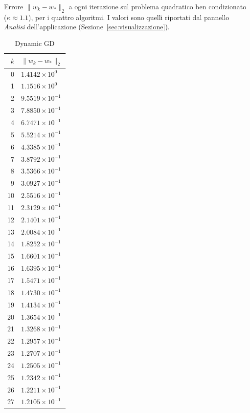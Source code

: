 \documentclass[italian, a4paper, twoside, binding=6mm]{sapthesis}
\begin{document}
\begin{table}[H]
\centering
\footnotesize
\renewcommand{\arraystretch}{0.85}
\setlength{\tabcolsep}{3pt}
\caption{Errore $\|w_k-w_*\|_2$ a ogni iterazione sul problema quadratico ben condizionato ($\kappa \approx 1.1$), per i quattro algoritmi. I valori sono quelli riportati dal pannello \emph{Analisi} dell'applicazione (Sezione~\ref{sec:visualizzazione}).}
\label{tab:test_bencond}
\begin{subtable}{0.24\textwidth}
\centering
\caption{Dynamic GD}
\begin{tabular}{@{}rl@{}}
\toprule
$k$ & $\|w_k-w_*\|_2$\\
\midrule
0 & $1.4142\times10^{0}$\\
1 & $1.1516\times10^{0}$\\
2 & $9.5519\times10^{-1}$\\
3 & $7.8850\times10^{-1}$\\
4 & $6.7471\times10^{-1}$\\
5 & $5.5214\times10^{-1}$\\
6 & $4.3385\times10^{-1}$\\
7 & $3.8792\times10^{-1}$\\
8 & $3.5366\times10^{-1}$\\
9 & $3.0927\times10^{-1}$\\
10 & $2.5516\times10^{-1}$\\
11 & $2.3129\times10^{-1}$\\
12 & $2.1401\times10^{-1}$\\
13 & $2.0084\times10^{-1}$\\
14 & $1.8252\times10^{-1}$\\
15 & $1.6601\times10^{-1}$\\
16 & $1.6395\times10^{-1}$\\
17 & $1.5471\times10^{-1}$\\
18 & $1.4730\times10^{-1}$\\
19 & $1.4134\times10^{-1}$\\
20 & $1.3654\times10^{-1}$\\
21 & $1.3268\times10^{-1}$\\
22 & $1.2957\times10^{-1}$\\
23 & $1.2707\times10^{-1}$\\
24 & $1.2505\times10^{-1}$\\
25 & $1.2342\times10^{-1}$\\
26 & $1.2211\times10^{-1}$\\
27 & $1.2105\times10^{-1}$\\

\end{tabular}
\end{subtable}
\end{table}
\end{document}
